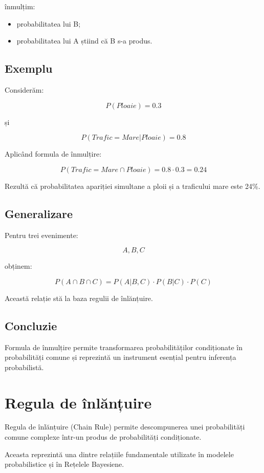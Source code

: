 \documentclass[12pt,a4paper]{article}
\begin{document}
înmulțim:

\begin{itemize}
\item probabilitatea lui B;
\item probabilitatea lui A știind că B s-a produs.
\end{itemize}

\subsection{Exemplu}

Considerăm:

\[
P(Ploaie)=0.3
\]

și

\[
P(Trafic=Mare|Ploaie)=0.8
\]

Aplicând formula de înmulțire:

\[
P(Trafic=Mare \cap Ploaie)
=
0.8 \cdot 0.3
=
0.24
\]

Rezultă că probabilitatea apariției simultane a ploii și a traficului mare este 24\%.

\subsection{Generalizare}

Pentru trei evenimente:

\[
A,B,C
\]

obținem:

\[
P(A \cap B \cap C)
=
P(A|B,C)
\cdot
P(B|C)
\cdot
P(C)
\]

Această relație stă la baza regulii de înlănțuire.

\subsection{Concluzie}

Formula de înmulțire permite transformarea probabilităților condiționate în probabilități comune și reprezintă un instrument esențial pentru inferența probabilistă.



\section{Regula de înlănțuire}

Regula de înlănțuire (Chain Rule) permite descompunerea unei probabilități comune complexe într-un produs de probabilități condiționate.

Aceasta reprezintă una dintre relațiile fundamentale utilizate în modelele probabilistice și în Rețelele Bayesiene.
\end{document}
